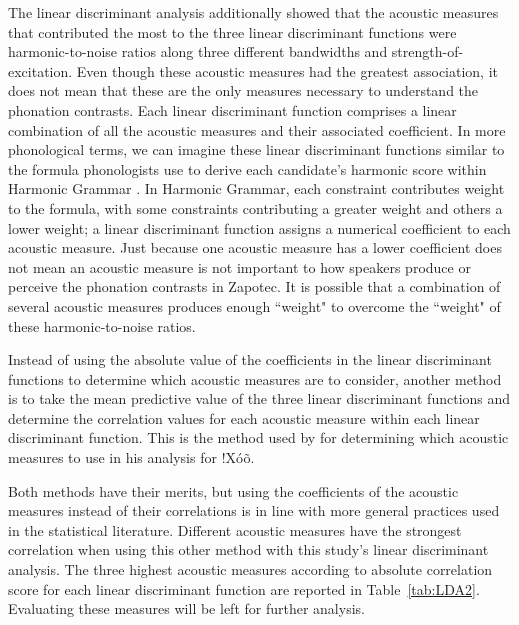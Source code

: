 \documentclass[12pt, letterpaper]{article}
\begin{document}
The linear discriminant analysis additionally showed that the acoustic measures that contributed the most to the three linear discriminant functions were harmonic-to-noise ratios along three different bandwidths and strength-of-excitation. Even though these acoustic measures had the greatest association, it does not mean that these are the only measures necessary to understand the phonation contrasts. Each linear discriminant function comprises a linear combination of all the acoustic measures and their associated coefficient. In more phonological terms, we can imagine these linear discriminant functions similar to the formula phonologists use to derive each candidate's harmonic score within Harmonic Grammar \citep{smolenskyHarmonicMindNeural2006}. In Harmonic Grammar, each constraint contributes weight to the formula, with some constraints contributing a greater weight and others a lower weight; a linear discriminant function assigns a numerical coefficient to each acoustic measure. Just because one acoustic measure has a lower coefficient does not mean an acoustic measure is not important to how speakers produce or perceive the phonation contrasts in Zapotec. It is possible that a combination of several acoustic measures produces enough ``weight" to overcome the ``weight" of these harmonic-to-noise ratios. 

Instead of using the absolute value of the coefficients in the linear discriminant functions to determine which acoustic measures are to consider, another method is to take the mean predictive value of the three linear discriminant functions and determine the correlation values for each acoustic measure within each linear discriminant function. This is the method used by \citet{garellekAcousticDiscriminabilityComplex2020} for determining which acoustic measures to use in his analysis for !Xóõ. 

Both methods have their merits, but using the coefficients of the acoustic measures instead of their correlations is in line with more general practices used in the statistical literature. Different acoustic measures have the strongest correlation when using this other method with this study's linear discriminant analysis. The three highest acoustic measures according to absolute correlation score for each linear discriminant function are reported in Table~\ref{tab:LDA2}. Evaluating these measures will be left for further analysis. 
\end{document}

